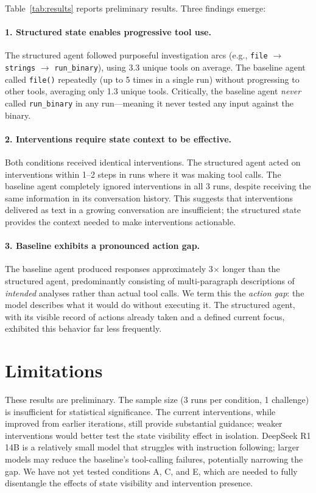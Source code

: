 \documentclass[letterpaper]{article}
\begin{document}
Table~\ref{tab:results} reports preliminary results.
Three findings emerge:

\paragraph{1. Structured state enables progressive tool use.}
The structured agent followed purposeful investigation arcs (e.g., \texttt{file} $\rightarrow$ \texttt{strings} $\rightarrow$ \texttt{run\_binary}), using 3.3 unique tools on average.
The baseline agent called \texttt{file()} repeatedly (up to 5 times in a single run) without progressing to other tools, averaging only 1.3 unique tools.
Critically, the baseline agent \emph{never} called \texttt{run\_binary} in any run---meaning it never tested any input against the binary.

\paragraph{2. Interventions require state context to be effective.}
Both conditions received identical interventions.
The structured agent acted on interventions within 1--2 steps in runs where it was making tool calls.
The baseline agent completely ignored interventions in all 3 runs, despite receiving the same information in its conversation history.
This suggests that interventions delivered as text in a growing conversation are insufficient; the structured state provides the context needed to make interventions actionable.

\paragraph{3. Baseline exhibits a pronounced action gap.}
The baseline agent produced responses approximately 3$\times$ longer than the structured agent, predominantly consisting of multi-paragraph descriptions of \emph{intended} analyses rather than actual tool calls.
We term this the \emph{action gap}: the model describes what it would do without executing it.
The structured agent, with its visible record of actions already taken and a defined current focus, exhibited this behavior far less frequently.

\section{Limitations}

These results are preliminary.
The sample size (3 runs per condition, 1 challenge) is insufficient for statistical significance.
The current interventions, while improved from earlier iterations, still provide substantial guidance; weaker interventions would better test the state visibility effect in isolation.
DeepSeek R1 14B is a relatively small model that struggles with instruction following; larger models may reduce the baseline's tool-calling failures, potentially narrowing the gap.
We have not yet tested conditions A, C, and E, which are needed to fully disentangle the effects of state visibility and intervention presence.
\end{document}
